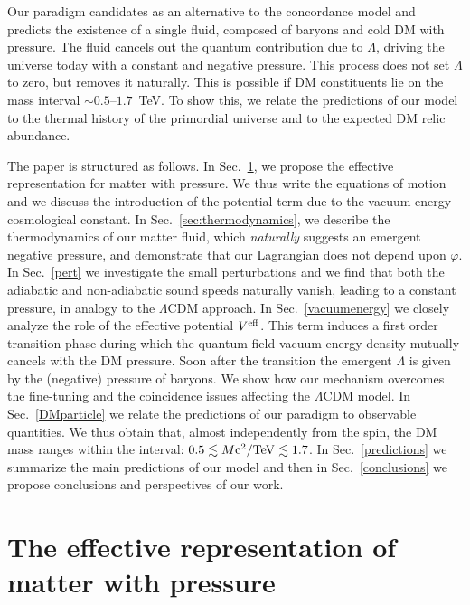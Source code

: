 \documentclass[twocolumn,showpacs, nofootinbib,aps,superscriptaddress, eqsecnum,prd,prl,notitlepage,showkeys,10pt,reprint]{revtex4-1}
\begin{document}
Our paradigm candidates as an alternative to the concordance model and predicts the existence of a single fluid, composed of baryons and cold DM with pressure. The fluid cancels out the quantum contribution due to $\Lambda$, driving the universe today with a constant and negative pressure. This process does not set $\Lambda$ to zero, but removes it naturally. This is possible if DM constituents lie on the mass interval $\sim0.5$--$1.7$~TeV. To show this, we relate the predictions of our model to the thermal history of the primordial universe and to the expected DM relic abundance.

The paper is structured as follows. In Sec.~\ref{sec:action}, we propose the effective representation for matter with pressure.
We thus write the equations of motion and we discuss the introduction of the potential term due to the vacuum energy cosmological constant.
In Sec.~\ref{sec:thermodynamics}, we describe the thermodynamics of our matter fluid, which \emph{naturally} suggests an emergent negative pressure, and demonstrate that our Lagrangian does not depend upon $\varphi$.
In Sec.~\ref{pert} we investigate the small perturbations and we find that both the adiabatic and non-adiabatic sound speeds naturally vanish, leading to a constant pressure, in analogy to the $\Lambda$CDM approach.
In Sec.~\ref{vacuumenergy} we closely analyze the role of the effective potential $V^{\rm eff}$. This term induces a first order transition phase during which the quantum field vacuum energy density mutually cancels with the DM pressure.
Soon after the transition the emergent $\Lambda$ is given by the (negative) pressure of baryons.
We show how our mechanism overcomes the fine-tuning and the coincidence issues affecting the $\Lambda$CDM model.
In Sec.~\ref{DMparticle} we relate the predictions of our paradigm to observable quantities. We thus obtain that, almost independently from the spin, the DM mass ranges within the interval: $0.5\lesssim M{\rm c^2/ TeV} \lesssim1.7$.
In Sec.~\ref{predictions} we summarize the main predictions of our model and then in Sec.~\ref{conclusions} we propose conclusions and perspectives of our work.




\section{The effective representation of matter with pressure}\label{sec:action}
\end{document}
